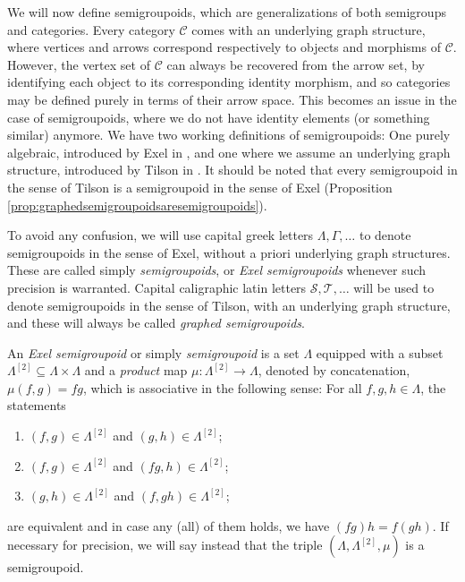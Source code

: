 We will now define semigroupoids, which are generalizations of both semigroups and categories. Every category $\mathcal{C}$ comes with an underlying graph structure, where vertices and arrows correspond respectively to objects and morphisms of $\mathcal{C}$. However, the vertex set of $\mathcal{C}$ can always be recovered from the arrow set, by identifying each object to its corresponding identity morphism, and so categories may be defined purely in terms of their arrow space. This becomes an issue in the case of semigroupoids, where we do not have identity elements (or something similar) anymore. We have two working definitions of semigroupoids: One purely algebraic, introduced by Exel in \cite{MR2754831}, and one where we assume an underlying graph structure, introduced by Tilson in \cite{MR915990}. It should be noted that every semigroupoid in the sense of Tilson is a semigroupoid in the sense of Exel (Proposition \ref{prop:graphedsemigroupoidsaresemigroupoids}).

To avoid any confusion, we will use capital greek letters $\Lambda,\Gamma,\ldots$ to denote semigroupoids in the sense of Exel, without a priori underlying graph structures. These are called simply \emph{semigroupoids}, or \emph{Exel semigroupoids} whenever such precision is warranted. Capital caligraphic latin letters $\mathcal{S},\mathcal{T},\ldots$ will be used to denote semigroupoids in the sense of Tilson, with an underlying graph structure, and these will always be called \emph{graphed semigroupoids}.

\begin{definition}[{\cite[Definition 2.1]{MR2754831}}]\label{def:semigroupoid}
An \emph{Exel semigroupoid} or simply \emph{semigroupoid} is a set $\Lambda$ equipped with a subset $\Lambda^{[2]}\subseteq\Lambda\times\Lambda$ and a \emph{product} map $\mu\colon\Lambda^{[2]}\to\Lambda$, denoted by concatenation, $\mu(f,g)=fg$, which is associative in the following sense: For all $f,g,h\in\Lambda$, the statements
\begin{enumerate}[label=(\roman*)]
    \item\label{def:semigroupoiditem1} $(f,g)\in\Lambda^{[2]}$ and $(g,h)\in\Lambda^{[2]}$;
    \item\label{def:semigroupoiditem2} $(f,g)\in\Lambda^{[2]}$ and $(fg,h)\in\Lambda^{[2]}$;
    \item\label{def:semigroupoiditem3} $(g,h)\in\Lambda^{[2]}$ and $(f,gh)\in\Lambda^{[2]}$;
\end{enumerate}
are equivalent and in case any (all) of them holds, we have $(fg)h=f(gh)$. If necessary for precision, we will say instead that the triple $(\Lambda,\Lambda^{[2]},\mu)$ is a semigroupoid.
\end{definition}

